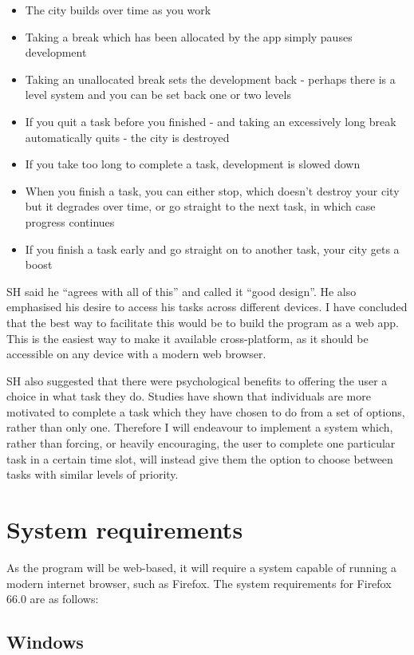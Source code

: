 \documentclass{article}
\begin{document}
\begin{itemize}
	\item The city builds over time as you work
	\item Taking a break which has been allocated by the app simply pauses
	      development
	\item Taking an unallocated break sets the development back - perhaps there is a
	      level system and you can be set back one or two levels
	\item If you quit a task before you finished - and taking an excessively long
	      break automatically quits - the city is destroyed
	\item If you take too long to complete a task, development is slowed down
	\item When you finish a task, you can either stop, which doesn't destroy your
	      city but it degrades over time, or go straight to the next task, in which case
	      progress continues
	\item If you finish a task early and go straight on to another task, your city
	      gets a boost
\end{itemize}

SH said he ``agrees with all of this'' and called it ``good design''. He also
emphasised his desire to access his tasks across different devices. I have
concluded that the best way to facilitate this would be to build the program as
a web app. This is the easiest way to make it available cross-platform, as it
should be accessible on any device with a modern web browser.

SH also suggested that there were psychological benefits to offering the user a
choice in what task they do. Studies have shown that individuals are more
motivated to complete a task which they have chosen to do from a set of options,
rather than only one. Therefore I will endeavour to implement a system which,
rather than forcing, or heavily encouraging, the user to complete one particular
task in a certain time slot, will instead give them the option to choose between
tasks with similar levels of priority.

\section{System requirements}
As the program will be web-based, it will require a system capable of running a
modern internet browser, such as Firefox. The system requirements for Firefox
66.0 are as follows:

\subsection*{Windows}\label{windows}
\end{document}
